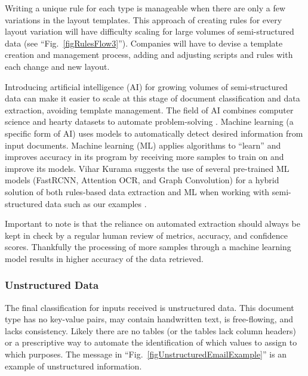 \documentclass[conference]{IEEEtran}
\begin{document}
Writing a unique rule for each type is manageable when there are only a few variations in the layout templates. This approach of creating rules for every layout variation will have difficulty scaling for large volumes of semi-structured data (see ``Fig.~\ref{figRulesFlow3}''). Companies will have to devise a template creation and management process, adding and adjusting scripts and rules with each change and new layout.

Introducing artificial intelligence (AI) for growing volumes of semi-structured data can make it easier to scale at this stage of document classification and data extraction, avoiding template management. The field of AI combines computer science and hearty datasets to automate problem-solving \cite{ibm:ai}. Machine learning (a specific form of AI) uses models to automatically detect desired information from input documents. Machine learning (ML) applies algorithms to ``learn'' and improves accuracy in its program by receiving more samples to train on and improve its models. Vihar Kurama suggests the use of several pre-trained ML models (FastRCNN, Attention OCR, and Graph Convolution) for a hybrid solution of both rules-based data extraction and ML when working with semi-structured data such as our examples \cite{kurama2021a}.

Important to note is that the reliance on automated extraction should always be kept in check by a regular human review of metrics, accuracy, and confidence scores. Thankfully the processing of more samples through a machine learning model results in higher accuracy of the data retrieved.

\subsubsection{Unstructured Data}
The final classification for inputs received is unstructured data. This document type has no key-value pairs, may contain handwritten text, is free-flowing, and lacks consistency. Likely there are no tables (or the tables lack column headers) or a prescriptive way to automate the identification of which values to assign to which purposes. The message in ``Fig.~\ref{figUnstructuredEmailExample}'' is an example of unstructured information.
\end{document}
